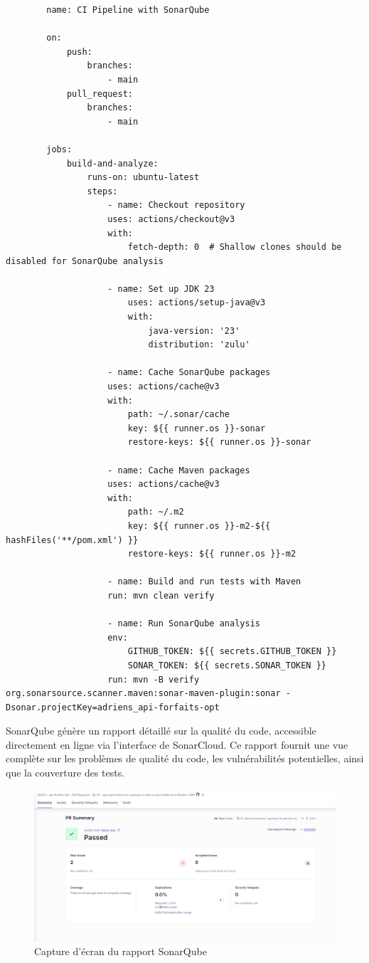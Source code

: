 \documentclass{article}
\begin{document}
	\begin{lstlisting}
		name: CI Pipeline with SonarQube
		
		on:
			push:
				branches:
					- main
			pull_request:
				branches:
					- main
		
		jobs:
			build-and-analyze:
				runs-on: ubuntu-latest
				steps:
					- name: Checkout repository
					uses: actions/checkout@v3
					with:
						fetch-depth: 0  # Shallow clones should be disabled for SonarQube analysis
		
					- name: Set up JDK 23
						uses: actions/setup-java@v3
						with:
							java-version: '23'
							distribution: 'zulu'
					
					- name: Cache SonarQube packages
					uses: actions/cache@v3
					with:
						path: ~/.sonar/cache
						key: ${{ runner.os }}-sonar
						restore-keys: ${{ runner.os }}-sonar
					
					- name: Cache Maven packages
					uses: actions/cache@v3
					with:
						path: ~/.m2
						key: ${{ runner.os }}-m2-${{ hashFiles('**/pom.xml') }}
						restore-keys: ${{ runner.os }}-m2
					
					- name: Build and run tests with Maven
					run: mvn clean verify
					
					- name: Run SonarQube analysis
					env:
						GITHUB_TOKEN: ${{ secrets.GITHUB_TOKEN }}
						SONAR_TOKEN: ${{ secrets.SONAR_TOKEN }}
					run: mvn -B verify org.sonarsource.scanner.maven:sonar-maven-plugin:sonar -Dsonar.projectKey=adriens_api-forfaits-opt
	\end{lstlisting}
	\newpage
	SonarQube génère un rapport détaillé sur la qualité du code, accessible directement en ligne via l'interface de SonarCloud. Ce rapport fournit une vue complète sur les problèmes de qualité du code, les vulnérabilités potentielles, ainsi que la couverture des tests.
	\begin{figure}[h!]
		\centering
		\includegraphics[width=\textwidth]{asset/sonarq.png}
		\caption{Capture d'écran du rapport SonarQube}
		\label{fig:sonarq-report}
	\end{figure}
	
\end{document}

